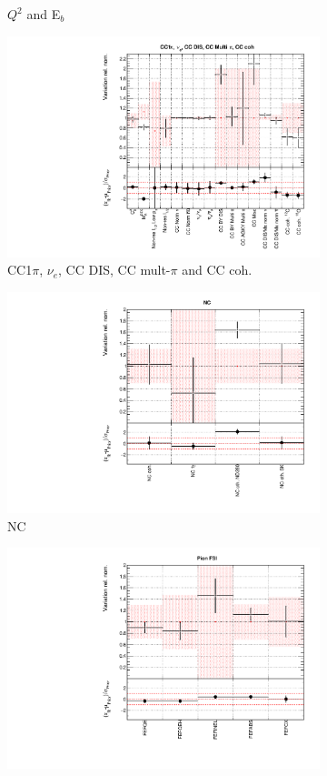 \begin{figure}
\begin{subfigure}{0.49\textwidth}
  \caption{$Q^2$ and E$_b$}
  \label{fig:}
\end{subfigure}
\begin{subfigure}{0.49\textwidth}
  \centering
  \includegraphics[width=0.95\linewidth]{figs/datxsec3}
  \caption{CC1$\pi$, $\nu_e$, CC DIS, CC mult-$\pi$ and CC coh.}
  \label{fig:}
\end{subfigure}
\begin{subfigure}{0.49\textwidth}
  \centering
  \includegraphics[width=0.95\linewidth]{figs/datxsec4}
  \caption{NC}
  \label{fig:}
\end{subfigure}
\begin{subfigure}{0.49\textwidth}
  \centering
  \includegraphics[width=0.95\linewidth]{figs/datxsec5}

\end{subfigure}
\end{figure}
